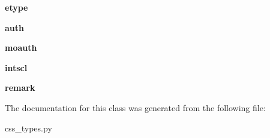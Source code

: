 \begin{DoxyCompactItemize}
\item 
\hypertarget{classcss__types_1_1origin28_a6b495a1025703a3a16a4c77422a0e8ad}{}{\bfseries etype}\label{classcss__types_1_1origin28_a6b495a1025703a3a16a4c77422a0e8ad}

\item 
\hypertarget{classcss__types_1_1origin28_af890d65dea548a4394814469722116c6}{}{\bfseries auth}\label{classcss__types_1_1origin28_af890d65dea548a4394814469722116c6}

\item 
\hypertarget{classcss__types_1_1origin28_a0148319840a990e392056c3431073e26}{}{\bfseries moauth}\label{classcss__types_1_1origin28_a0148319840a990e392056c3431073e26}

\item 
\hypertarget{classcss__types_1_1origin28_a6d4153f5b0443fc84121c5febcd85e43}{}{\bfseries intscl}\label{classcss__types_1_1origin28_a6d4153f5b0443fc84121c5febcd85e43}

\item 
\hypertarget{classcss__types_1_1origin28_a4c746ee42fd055827d4f71d63c92a4c7}{}{\bfseries remark}\label{classcss__types_1_1origin28_a4c746ee42fd055827d4f71d63c92a4c7}

\end{DoxyCompactItemize}


The documentation for this class was generated from the following file\+:\begin{DoxyCompactItemize}
\item 
css\+\_\+types.\+py\end{DoxyCompactItemize}
